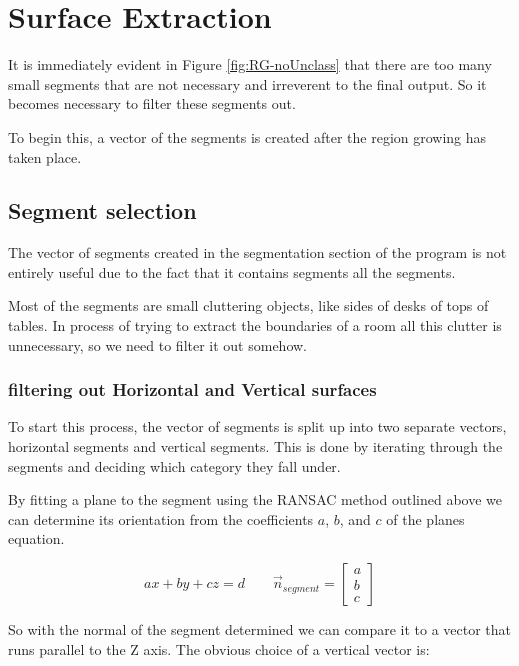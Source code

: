 		

	\section{Surface Extraction}
	
	It is immediately evident in Figure \ref{fig:RG-noUnclass} that there are too many small segments that are not necessary and irreverent to the final output. So it becomes necessary to filter these segments out.
	
	To begin this, a vector of the segments is created after the region growing has taken place.


	\subsection{Segment selection}
		The vector of segments created in the segmentation section of the program is not entirely useful due to the fact that it contains segments all the segments.
		
		Most of the segments are small cluttering objects, like sides of desks of tops of tables. In process of trying to extract the boundaries of a room all this clutter is unnecessary, so we need to filter it out somehow.
		\subsubsection{filtering out Horizontal and Vertical surfaces}
			To start this process, the vector of segments is split up into two separate vectors, horizontal segments and vertical segments. This is done by iterating through the segments and deciding which category they fall under.
			
			By fitting a plane to the segment using the RANSAC method outlined above we can determine its orientation from the coefficients $a$, $b$, and $c$ of the planes equation.
			
			\begin{equation}
			ax + by + cz = d  \quad\quad
			\vec{n}_{segment} = \begin{bmatrix}a\\b\\c\end{bmatrix}
			\end{equation}
			
			So with the normal of the segment determined we can compare it to a vector that runs parallel to the Z axis. The obvious choice of a vertical vector is:
			
